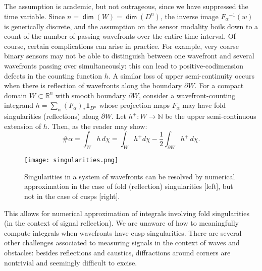 \documentclass{psapm-l}
\theoremstyle{definition}
\theoremstyle{remark}
\numberwithin{equation}{section}
\begin{document}
The assumption is academic, but not outrageous, since we have suppressed the time variable. Since $n={{{\operatorname{\mathsf{{dim}}}}}}(W)={{{\operatorname{\mathsf{{dim}}}}}}(D^n)$, the inverse image $F_\alpha{^{-1}}(w)$ is generically discrete, and the assumption on the sensor modality boils down to a count of the number of passing wavefronts over the entire time interval. Of course, certain complications can arise in practice. For example, very coarse binary sensors may not be able to distinguish between one wavefront and several wavefronts passing over simultaneously: this can lead to positive-codimension defects in the counting function $h$. A similar loss of upper semi-continuity occurs when there is reflection of wavefronts along the boundary $\partial W$. For a compact domain $W\subset{{\mathbb R}}^n$ with smooth boundary $\partial W$, consider a wavefront-counting integrand $h=\sum_\alpha (F_\alpha)_*{{\mathbf{1}}}_{D^n}$ whose projection maps $F_\alpha$ may have fold singularities (reflections) along $\partial W$. Let $h^+:W\to{{\mathbb N}}$ be the upper semi-continuous extension of $h$. Then, as the reader may show:
\begin{equation}
\label{eq:wavefront}
\#\alpha =
    \int_W h\,d\chi =
        \int_W h^+d\chi
        - \frac{1}{2}\int_{\partial W}h^+\,d\chi .
\end{equation}

\begin{figure}[hbt]
\begin{center}
\texttt{[image: singularities.png]}
\caption{Singularities in a system of wavefronts can be resolved by numerical approximation in the case of fold (reflection) singularities [left], but not in the case of cusps [right].}
\label{fig:singularities}
\end{center}
\end{figure}

This allows for numerical approximation of integrals involving fold singularities (in the context of signal reflection). We are unaware of how to meaningfully compute integrals when wavefronts have cusp singularities. There are several other challenges associated to measuring signals in the context of waves and obstacles: besides reflections and caustics, diffractions around corners are nontrivial and seemingly difficult to excise.
\end{document}
